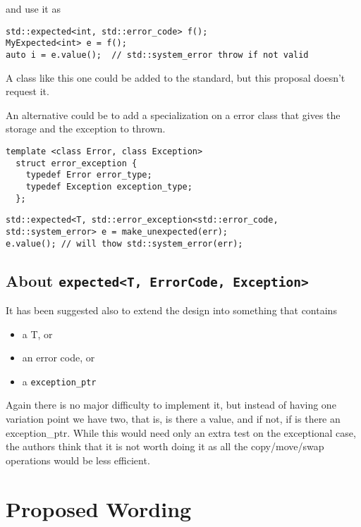 \documentclass[a4paper,10pt]{article}
\newcommand{\cpp}[1]{\lstinline{#1}}
\begin{document}
and use it as

\begin{lstlisting}
std::expected<int, std::error_code> f();
MyExpected<int> e = f();
auto i = e.value();  // std::system_error throw if not valid
\end{lstlisting}

A class like this one could be added to the standard, but this proposal doesn't request it. 

An alternative could be to add a specialization on a error class that gives the storage and the exception to thrown.

\begin{lstlisting}
template <class Error, class Exception>
  struct error_exception {
    typedef Error error_type;
    typedef Exception exception_type;
  };
\end{lstlisting}

\begin{lstlisting}
std::expected<T, std::error_exception<std::error_code, std::system_error> e = make_unexpected(err);
e.value(); // will thow std::system_error(err);
\end{lstlisting}


\subsection{About \cpp{expected<T, ErrorCode, Exception>}}

It has been suggested also to extend the design into something that contains 

\begin{itemize}
\item a T, or
\item an error code, or
\item a \cpp{exception_ptr} 
\end{itemize}

Again there is no major difficulty to implement it, but instead of having one variation point we have two, that is, is there a value, and if not, if is there an exception_ptr. While this would need only an extra test on the exceptional case, the authors think that it is not worth doing it as all the copy/move/swap operations would be less efficient. 

\section{Proposed Wording}
\end{document}
